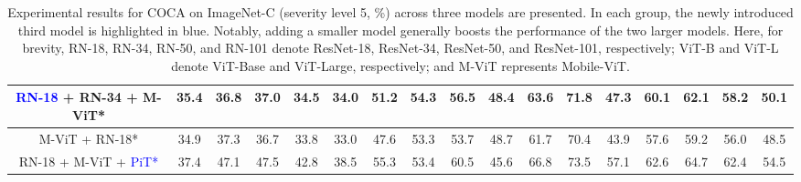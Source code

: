 \begin{table}[t]
\begin{center}
\begin{threeparttable}
{\begin{tabular}{c|ccc|cccc|cccc|cccc|c}
\textcolor{blue}{RN-18} + RN-34 + M-ViT* & 35.4 & 36.8 & 37.0 & 34.5 & 34.0 & 51.2 & 54.3 & 56.5 & 48.4 & 63.6 & 71.8 & 47.3 & 60.1 & 62.1 & 58.2 & 50.1 \\ \midrule \midrule
M-ViT + RN-18* & 34.9 & 37.3 & 36.7 & 33.8 & 33.0 & 47.6 & 53.3 & 53.7 & 48.7 & 61.7 & 70.4 & 43.9 & 57.6 & 59.2 & 56.0 & 48.5 \\ \midrule 
RN-18 + M-ViT + \textcolor{blue}{PiT*} & 37.4 & 47.1 & 47.5 & 42.8 & 38.5 & 55.3 & 53.4 & 60.5 & 45.6 & 66.8 & 73.5 & 57.1 & 62.6 & 64.7 & 62.4 & 54.5 \\ \midrule
\end{tabular}
        }
    \end{threeparttable}
    \end{center}
    \vspace{-0.2in}
    \caption{Experimental results for COCA on ImageNet-C (severity level 5, \%) across three models are presented. In each group, the newly introduced third model is highlighted in blue. Notably, adding a smaller model generally boosts the performance of the two larger models. Here, for brevity, RN-18, RN-34, RN-50, and RN-101 denote ResNet-18, ResNet-34, ResNet-50, and ResNet-101, respectively; ViT-B and ViT-L denote ViT-Base and ViT-Large, respectively; and M-ViT represents Mobile-ViT.}
    \label{multimodles}
\end{table}

\begin{figure}[h]
\end{figure}
\begin{figure}[h]
\end{figure}
\begin{figure}[h]
\end{figure}
\begin{figure}[h]
\end{figure}
\begin{figure}[h]
\end{figure}
\begin{figure}[h]
\end{figure}
\begin{figure}[h]
\end{figure}
\begin{figure}[h]
\end{figure}


